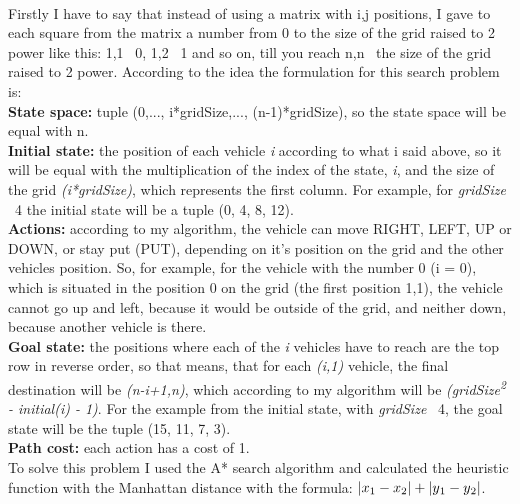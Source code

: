 \documentclass[14pt]{article}
\begin{document}
\vspace{2.5 mm}
\\Firstly I have to say that instead of using a matrix with i,j positions, I gave to each square from the matrix a number from 0 to the size of the grid raised to 2 power like this: 1,1 \textrightarrow \ 0, 1,2 \textrightarrow \ 1 and so on, till you reach n,n \textrightarrow \ the size of the grid raised to 2 power. According to the idea the formulation for this search problem is:
\\\textbf{State space:} tuple (0,..., i*gridSize,..., (n-1)*gridSize), so the state space will be equal with n.
\\\textbf{Initial state:} the position of each vehicle \textit{i} according to what i said above, so it will be equal with the multiplication of the index of the state, \textit{i}, and the size of the grid \textit{(i*gridSize)}, which represents the first column. For example, for \textit{gridSize} \eq \ 4 the initial state will be a tuple (0, 4, 8, 12).
\\\textbf{Actions:} according to my algorithm, the vehicle can move RIGHT, LEFT, UP or DOWN, or stay put (PUT), depending on it's position on the grid and the other vehicles position. So, for example, for the vehicle with the number 0 (i = 0), which is situated in the position 0 on the grid (the first position 1,1), the vehicle cannot go up and left, because it would be outside of the grid, and neither down, because another vehicle is there.
\\\textbf{Goal state:} the positions where each of the \textit{i} vehicles have to reach are the top row in reverse order, so that means, that for each \textit{(i,1)} vehicle, the final destination will be \textit{(n-i+1,n)}, which according to my algorithm will be \textit{(gridSize\textsuperscript{2} - initial(i) - 1)}. For the example from the initial state, with \textit{gridSize} \eq \ 4, the goal state will be the tuple (15, 11, 7, 3).
\\\textbf{Path cost:} each action has a cost of 1.
\vspace{2.5 mm}
\\To solve this problem I used the A* search algorithm and calculated the heuristic function with the Manhattan distance with the formula: $\left| x\textsubscript{1} - x\textsubscript{2} \right| + \left| y\textsubscript{1} - y\textsubscript{2} \right|$.
\newpage
\end{document}
